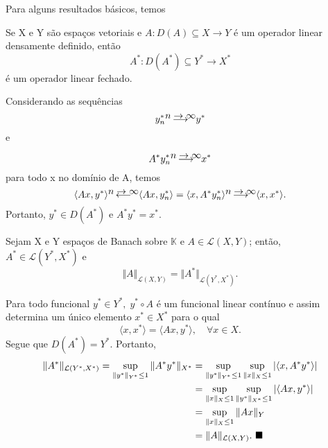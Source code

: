 \documentclass[../functional_analysis.tex]{subfiles}
\begin{document}
Para alguns resultados básicos, temos
\begin{prop*}
	Se X e Y são espaços vetoriais e \(A:D(A)\subseteq X\rightarrow Y\) é um operador linear densamente definido, então
	\[
		A^{*}:D(A^{*})\subseteq Y^{*}\rightarrow X^{*}
	\]
	é um operador linear fechado.
\end{prop*}
\begin{proof*}
	Considerando as sequências
	\[
		y_{n}^{*}\ensurestackMath{\stackon[0em]{\longrightarrow}{n\to \infty}}y^{*}
	\]
	e

	\[
		A^{*}y_{n}^{*}\ensurestackMath{\stackon[0em]{\longrightarrow}{n\to \infty}}x^{*}
	\]
	para todo x no domínio de A, temos
	\[
		\langle Ax, y^{*} \rangle \ensurestackMath{\stackon[0em]{\longleftarrow}{n\to \infty}} \langle Ax, y_{n}^{*} \rangle = \langle x, A^{*}y_{n}^{*} \rangle\ensurestackMath{\stackon[0em]{\longrightarrow}{n\to \infty}} \langle x, x^{*} \rangle.
	\]
	Portanto, \(y^{*}\in D(A^{*})\) e \(A^{*}y^{*} = x^{*}.\) \qedsymbol
\end{proof*}
\begin{lemma*}
	Sejam X e Y espaços de Banach sobre \(\mathbb{K}\) e \(A\in \mathcal{L}(X, Y)\); então, \(A^{*}\in \mathcal{L}(Y^{*}, X^{*})\) e
	\[
		\Vert A \Vert_{\mathcal{L}(X, Y)} = \Vert A^{*} \Vert_{\mathcal{L}(Y^{*}, X^{*})}.
	\]
\end{lemma*}
\begin{proof*}
	Para todo funcional \(y^{*}\in Y^{*},\; y^{*}\circ A\) é um funcional linear contínuo e assim determina um único elemento \(x^{*}\in X^{*}\) para o qual
	\[
		\langle x, x^{*} \rangle = \langle Ax, y^{*} \rangle,\quad \forall x\in X.
	\]
	Segue que \(D(A^{*})=Y^{*}.\) Portanto,
	\begin{align*}
		\Vert A^{*} \Vert_{\mathcal{L}(Y^{*}, X^{*})} = \sup_{\Vert y^{*} \Vert_{Y^{*}}\leq 1}\Vert A^{*}y^{*} \Vert_{X^{*}} & = \sup_{\Vert y^{*} \Vert_{Y^{*}}\leq 1}\sup_{\Vert x \Vert_{X}\leq 1}| \langle x, A^{*}y^{*} \rangle | \\
		                                                                                                                     & = \sup_{\Vert x \Vert_{X}\leq 1}\sup_{\Vert y^{*} \Vert_{X^{*}}\leq 1} | \langle Ax, y^{*} \rangle |    \\
		                                                                                                                     & = \sup_{\Vert x \Vert_{X}\leq 1}\Vert Ax \Vert_{Y}                                                      \\
		                                                                                                                     & = \Vert A \Vert_{\mathcal{L}(X, Y)}. \text{ $\blacksquare$}
	\end{align*}
\end{proof*}
\end{document}
